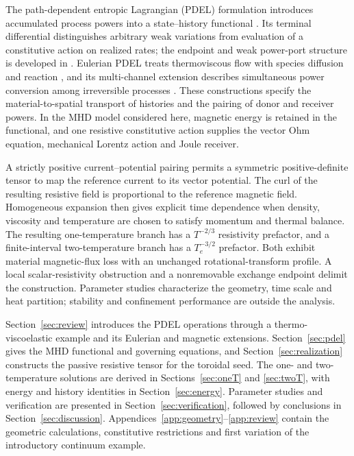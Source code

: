 \documentclass[11pt,a4paper]{article}
\theoremstyle{remark}\newtheorem{remark}{Remark}
\numberwithin{equation}{section}
\begin{document}
The path-dependent entropic Lagrangian (PDEL) formulation introduces accumulated process powers into a state--history functional \citep{RenEntropy,Ren}. Its terminal differential distinguishes arbitrary weak variations from evaluation of a constitutive action on realized rates; the endpoint and weak power-port structure is developed in \citet{RenSpending}. Eulerian PDEL treats thermoviscous flow with species diffusion and reaction \citep{RenEulerian}, and its multi-channel extension describes simultaneous power conversion among irreversible processes \citep{RenMultiChannel}. These constructions specify the material-to-spatial transport of histories and the pairing of donor and receiver powers. In the MHD model considered here, magnetic energy is retained in the functional, and one resistive constitutive action supplies the vector Ohm equation, mechanical Lorentz action and Joule receiver.

A strictly positive current--potential pairing permits a symmetric positive-definite tensor to map the reference current to its vector potential. The curl of the resulting resistive field is proportional to the reference magnetic field. Homogeneous expansion then gives explicit time dependence when density, viscosity and temperature are chosen to satisfy momentum and thermal balance. The resulting one-temperature branch has a $T^{-2/3}$ resistivity prefactor, and a finite-interval two-temperature branch has a $T_e^{-3/2}$ prefactor. Both exhibit material magnetic-flux loss with an unchanged rotational-transform profile. A local scalar-resistivity obstruction and a nonremovable exchange endpoint delimit the construction. Parameter studies characterize the geometry, time scale and heat partition; stability and confinement performance are outside the analysis.

Section~\ref{sec:review} introduces the PDEL operations through a thermo-viscoelastic example and its Eulerian and magnetic extensions. Section~\ref{sec:pdel} gives the MHD functional and governing equations, and Section~\ref{sec:realization} constructs the passive resistive tensor for the toroidal seed. The one- and two-temperature solutions are derived in Sections~\ref{sec:oneT} and \ref{sec:twoT}, with energy and history identities in Section~\ref{sec:energy}. Parameter studies and verification are presented in Section~\ref{sec:verification}, followed by conclusions in Section~\ref{sec:discussion}. Appendices~\ref{app:geometry}--\ref{app:review} contain the geometric calculations, constitutive restrictions and first variation of the introductory continuum example.
\end{document}
